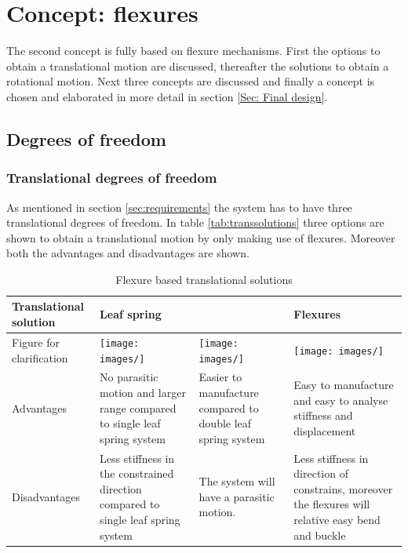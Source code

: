 \section{Concept: flexures}
\label{Concept: flexures}
The second concept is fully based on flexure mechanisms. First the options to obtain a translational motion are discussed, thereafter the solutions to obtain a rotational motion. Next three concepts are discussed and finally a concept is chosen and elaborated in more detail in section \ref{Sec: Final design}.    
\subsection{Degrees of freedom }
\subsubsection{Translational degrees of freedom}
As mentioned in section \ref{sec:requirements} the system has to have three translational degrees of freedom. In table \ref{tab:transsolutions} three options are shown to obtain a translational motion by only making use of flexures. Moreover both the advantages and disadvantages are shown.

\begin{table}[h]
\caption{Flexure based translational solutions}
\label{Tab: flexure translational}
\begin{tabular}{p{4cm}|p{4cm}p{4cm}p{4cm}}
Translational solution   & Leaf spring \cite{lecturesheets} &  \cite{PrecisionParallel} & Flexures \cite{lecturesheets} \\ \hline
Figure for clarification &     
    \begin{minipage}{4cm}
      \texttt{[image: images/]}
    \end{minipage} 
    &     
    \begin{minipage}{4cm}
      \texttt{[image: images/]}
    \end{minipage} 
    &     
    \begin{minipage}{4cm}
      \texttt{[image: images/]}
    \end{minipage} \\ \hline
Advantages               & No parasitic motion and larger range compared to single leaf spring system     & Easier to manufacture compared to double leaf spring system  & Easy to manufacture and easy to analyse stiffness and displacement \\ \hline
Disadvantages            &  Less stiffness in the constrained direction compared to single leaf spring system                      & The system will have a parasitic motion.   & Less stiffness in direction of constrains, moreover the flexures will relative easy bend and buckle \\ 
\end{tabular}
\end{table}


